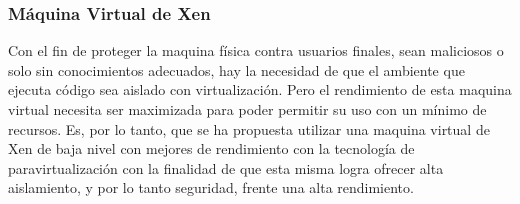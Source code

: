    
\subsubsection{Máquina Virtual de Xen}
Con el fin de proteger la maquina física contra usuarios finales, sean maliciosos o solo sin conocimientos adecuados, hay la necesidad de que el ambiente que ejecuta código sea aislado con virtualización. Pero el rendimiento de esta maquina virtual necesita ser maximizada para poder permitir su uso con un mínimo de recursos. Es, por lo tanto, que se ha propuesta utilizar una maquina virtual de Xen de baja nivel con mejores de rendimiento con la tecnología de paravirtualización con la finalidad de que esta misma logra ofrecer alta aislamiento, y por lo tanto seguridad, frente una alta rendimiento.

